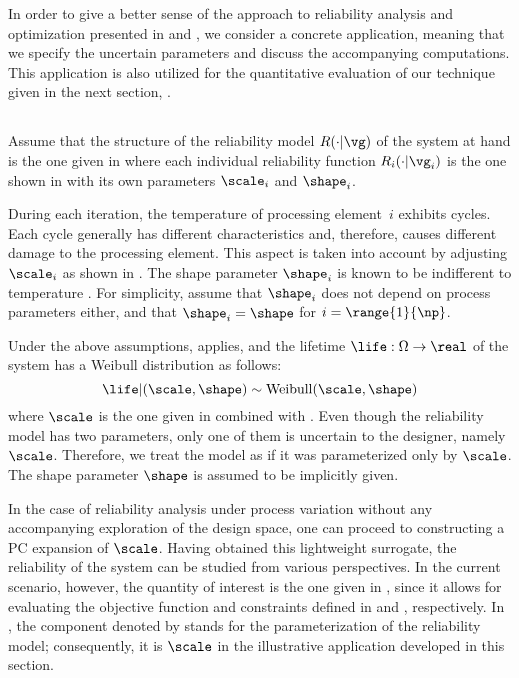 In order to give a better sense of the approach to reliability analysis and
optimization presented in  and
, we consider a concrete application, meaning that we
specify the uncertain parameters and discuss the accompanying computations. This
application is also utilized for the quantitative evaluation of our technique
given in the next section, .

\subsection{\problemtitle}

Assume that the structure of the reliability model $R(\cdot | \vg)$ of the
system at hand is the one given in  where each
individual reliability function $R_i(\cdot | \vg_i)$ is the one shown in
 with its own parameters $\scale_i$ and $\shape_i$.

During each iteration, the temperature of processing element~$i$ exhibits 
cycles. Each cycle generally has different characteristics and, therefore,
causes different damage to the processing element. This aspect is taken into
account by adjusting $\scale_i$ as shown in . The
shape parameter $\shape_i$ is known to be indifferent to temperature
\cite{chang2006}. For simplicity, assume that $\shape_i$ does not depend on
process parameters either, and that $\shape_i = \shape$ for $i =
\range{1}{\np}$.

Under the above assumptions,  applies, and the
lifetime $\life: \Omega \to \real$ of the system has a Weibull distribution as
follows:
\[
  \life | (\scale, \shape) \sim \mathrm{Weibull}(\scale, \shape)
\]
where $\scale$ is the one given in  combined with
. Even though the reliability model has two
parameters, only one of them is uncertain to the designer, namely $\scale$.
Therefore, we treat the model as if it was parameterized only by $\scale$. The
shape parameter $\shape$ is assumed to be implicitly given.

In the case of reliability analysis under process variation without any
accompanying exploration of the design space, one can proceed to constructing a
\ac{PC} expansion of $\scale$. Having obtained this lightweight surrogate, the
reliability of the system can be studied from various perspectives. In the
current scenario, however, the quantity of interest \g is the one given in
, since it allows for evaluating the objective
function and constraints defined in  and
, respectively. In
, the component denoted by \life stands for
the parameterization of the reliability model; consequently, it is $\scale$ in
the illustrative application developed in this section.

